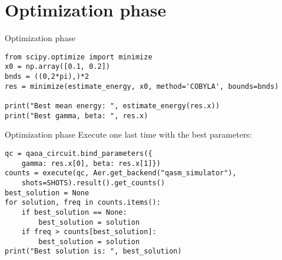 \section{Optimization phase}
\SectionPage{}

\begin{frame}[fragile]{Optimization phase}
\begin{verbatim}
from scipy.optimize import minimize
x0 = np.array([0.1, 0.2])
bnds = ((0,2*pi),)*2
res = minimize(estimate_energy, x0, method='COBYLA', bounds=bnds)

print("Best mean energy: ", estimate_energy(res.x))
print("Best gamma, beta: ", res.x)
\end{verbatim}
\end{frame}


\begin{frame}[fragile]{Optimization phase}
Execute one last time with the best parameters:\bigskip

\begin{verbatim}
qc = qaoa_circuit.bind_parameters({
    gamma: res.x[0], beta: res.x[1]})
counts = execute(qc, Aer.get_backend("qasm_simulator"), 
    shots=SHOTS).result().get_counts()
best_solution = None
for solution, freq in counts.items():
    if best_solution == None:
        best_solution = solution
    if freq > counts[best_solution]:
        best_solution = solution
print("Best solution is: ", best_solution)
\end{verbatim}
\end{frame}



